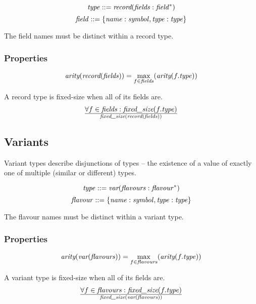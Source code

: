 \documentclass[a4paper]{report}
\newcommand\arity{{\ensuremath\textit{arity}}}
\newcommand\fixedsize{{\ensuremath\textit{fixed\_size}}}
\newcommand\tyVar{{\ensuremath\textit{var}}}
\newcommand\tyRecord{{\ensuremath\textit{record}}}
\begin{document}
$$\it type ::= \tyRecord(fields : field^*)$$
$$\it field ::= \{name:symbol, type:type\}$$

The field names must be distinct within a record type.

\subsubsection*{Properties}

$$
\arity(\tyRecord({\it fields})) = \max_{f \in {\it fields}}(\arity(f.{\it type}))
$$


A record type is fixed-size when all of its fields are.
$${\forall f \in {\it fields} : \fixedsize(f.{\it type})} \over
  \fixedsize(\tyRecord({\it fields}))
$$

\subsection{Variants}
Variant types describe disjunctions of types -- the
existence of a value of exactly one of multiple (similar or different) types.

$$\it type ::= \tyVar(flavours : flavour^*)$$
$$\it flavour ::= \{name:symbol, type:type\}$$

The flavour names must be distinct within a variant type.

\subsubsection*{Properties}

$$
\arity(\tyVar({\it flavours})) = \max_{f \in {\it flavours}}(\arity(f.{\it type}))
$$


A variant type is fixed-size when all of its fields are.
$${\forall f \in {\it flavours} : \fixedsize(f.{\it type})} \over
  \fixedsize(\tyVar({\it flavours}))
$$
\end{document}
